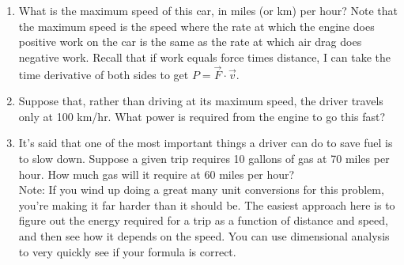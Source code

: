 \documentclass[12pt]{article}
\begin{document}
\begin{enumerate}
{      \begin{enumerate}
        \item{What is the maximum speed of this car, in miles (or km) per hour? Note that the maximum speed is
the speed where the rate at which the engine does positive work on the car is the same as the rate at which 
air drag does negative work. Recall that if work equals force times distance, I can take the time derivative 
of both sides to get $P=\vec F \cdot \vec v$.}
        \item{Suppose that, rather than driving at its maximum speed, the driver travels only at 100 km/hr. What power is required from the engine to go this fast?}
        \item{It's said that one of the most important things a driver can do to save fuel is to slow down. Suppose a given trip requires 10 gallons of gas at 70 miles per hour. How much gas will it require at 60 miles per hour?\\
          {\sc Note:} If you wind up doing a great many unit conversions for this problem, you're making it far harder than it should be. The easiest approach here is to figure out the energy required for a trip as a function of distance and speed,
        and then see how it depends on the speed. You can use dimensional analysis to very quickly see if your formula is correct.}
    \end{enumerate}
  }




    \end{enumerate}
\end{document}
